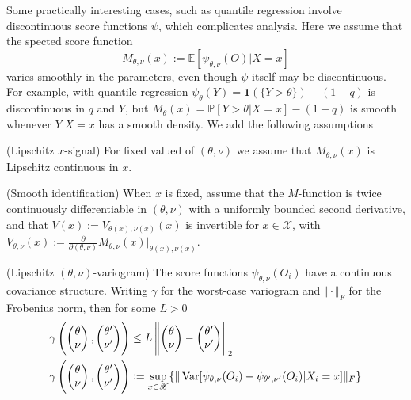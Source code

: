 Some practically interesting cases, such as quantile regression involve discontinuous score functions $\psi$, which complicates analysis. Here we assume that the spected score function
\begin{equation}
	\label{eq:expected_score}
	M_{\theta,\nu}(x) := \mathbb{E}[\psi_{\theta,\nu}(O)|X = x]
\end{equation}
varies smoothly in the parameters, even though $\psi$ itself may be discontinuous. For example, with quantile regression $\psi_{\theta}(Y) = \mathbf{1}(\{Y > \theta\}) - (1-q)$ is discontinuous in $q$ and $Y$, but $M_\theta(x) = \mathbb{P}[Y > \theta | X = x] - (1-q)$ is smooth whenever $Y|X=x$ has a smooth density. We add the following assumptions

\begin{assumption}{(Lipschitz $x$-signal) }
\label{as:lipschitz}
For fixed valued of $(\theta, \nu)$ we assume that $M_{\theta,\nu}(x)$ is Lipschitz continuous in $x$. 
\end{assumption}

\begin{assumption}{(Smooth identification) }
\label{as:smooth_id}
When $x$ is fixed, assume that the $M$-function is twice continuously differentiable in $(\theta, \nu)$ with a uniformly bounded second derivative, and that $V(x) := V_{\theta(x), \nu(x)}(x)$ is invertible for $x \in \mathscr{X}$, with $V_{\theta,\nu}(x) := \frac{\partial}{\partial(\theta, \nu)} M_{\theta,\nu}(x)\bigg|_{\theta(x),\nu(x)}$.
\end{assumption}
\begin{assumption}{(Lipschitz $(\theta, \nu)$-variogram) }
\label{as:lipschitz_variogram}
The score functions $\psi_{\theta,\nu}(O_i)$ have a continuous covariance structure. Writing $\gamma$ for the worst-case variogram and $\Vert \cdot \Vert_{F}$ for the Frobenius norm, then for some $L > 0$
\begin{align*}
\gamma\left( \begin{pmatrix} \theta \\ \nu \end{pmatrix}, \begin{pmatrix} \theta' \\ \nu' \end{pmatrix}    \right) &\leq L \left\Vert \begin{pmatrix} \theta \\ \nu \end{pmatrix} - \begin{pmatrix} \theta' \\ \nu' \end{pmatrix}  \right\Vert_2 \\
\gamma\left( \begin{pmatrix} \theta \\ \nu \end{pmatrix}, \begin{pmatrix} \theta' \\ \nu' \end{pmatrix}    \right) &:= \sup_{ x \in \mathscr{X} }\{\Vert \operatorname{Var} [\psi_{\theta, \nu}(O_i) - \psi_{\theta', \nu'}(O_i) | X_i = x]\Vert_F  \}
\end{align*}
\end{assumption}

